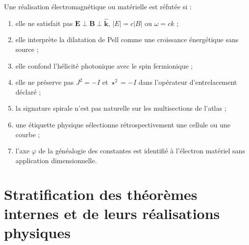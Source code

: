 Une réalisation électromagnétique ou matérielle est réfutée si :
\begin{enumerate}
\item elle ne satisfait pas \(\mathbf E\perp\mathbf B\perp\widehat{\mathbf k}\), \(|E|=c|B|\) ou \(\omega=ck\) ;
\item elle interprète la dilatation de Pell comme une croissance énergétique sans source ;
\item elle confond l'hélicité photonique avec le spin fermionique ;
\item elle ne préserve pas \(J^2=-I\) et \(\star^2=-I\) dans l'opérateur d'entrelacement déclaré ;
\item la signature spirale n'est pas naturelle sur les multisections de l'atlas ;
\item une étiquette physique sélectionne rétrospectivement une cellule ou une courbe ;
\item l'axe \(\varphi\) de la généalogie des constantes est identifié à l'électron matériel sans application dimensionnelle.
\end{enumerate}

\section{Stratification des théorèmes internes et de leurs réalisations physiques}

